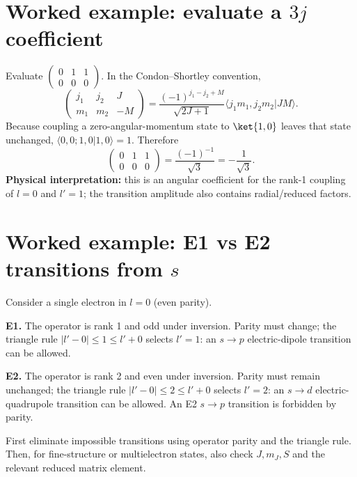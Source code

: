 
\section{Worked example: evaluate a \(3j\) coefficient}
Evaluate \(\begin{pmatrix}0&1&1\\0&0&0\end{pmatrix}\).
In the Condon--Shortley convention,
\[
\begin{pmatrix}j_1&j_2&J\\m_1&m_2&-M\end{pmatrix}
=\frac{(-1)^{j_1-j_2+M}}{\sqrt{2J+1}}
\langle j_1m_1,j_2m_2|JM\rangle.
\]
Because coupling a zero-angular-momentum state to \(\ket{1,0}\)
leaves that state unchanged,
\(\langle0,0;1,0|1,0\rangle=1\).
Therefore
\[
\boxed{\begin{pmatrix}0&1&1\\0&0&0\end{pmatrix}
=\frac{(-1)^{-1}}{\sqrt3}=-\frac1{\sqrt3}.}
\]
\textbf{Physical interpretation:} this is an angular coefficient
for the rank-1 coupling of \(l=0\) and \(l'=1\);
the transition amplitude also contains radial/reduced factors.

\section{Worked example: E1 vs E2 transitions from \(s\)}
Consider a single electron in \(l=0\) (even parity).

\textbf{E1.} The operator is rank 1 and odd under inversion.
Parity must change; the triangle rule
\(|l'-0|\le1\le l'+0\) selects \(l'=1\): an \(s\to p\)
electric-dipole transition can be allowed.

\textbf{E2.} The operator is rank 2 and even under inversion.
Parity must remain unchanged; the triangle rule
\(|l'-0|\le2\le l'+0\) selects \(l'=2\): an \(s\to d\)
electric-quadrupole transition can be allowed.
An E2 \(s\to p\) transition is forbidden by parity.

\begin{methodbox}
First eliminate impossible transitions using operator parity and the
triangle rule. Then, for fine-structure or multielectron states,
also check \(J,m_J,S\) and the relevant reduced matrix element.
\end{methodbox}
